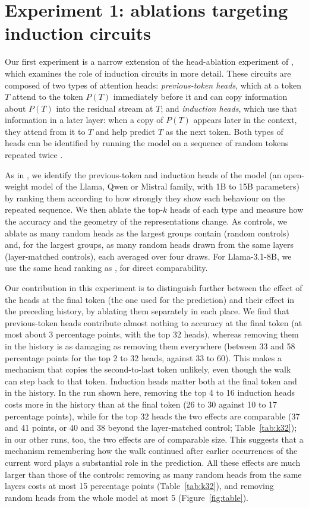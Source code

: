 \documentclass[11pt,a4paper]{article}
\begin{document}
\section{Experiment 1: ablations targeting induction circuits}

Our first experiment is a narrow extension of the head-ablation experiment of \citet{arditi2026}, which examines the
role of induction circuits \citep{olsson2022} in more detail. These circuits are composed of two types of attention
heads: \emph{previous-token heads}, which at a token $T$ attend to the token $P(T)$ immediately before it and can copy
information about $P(T)$ into the residual stream at $T$; and \emph{induction heads}, which use that information in a
later layer: when a copy of $P(T)$ appears later in the context, they attend from it to $T$ and help predict $T$ as the
next token. Both types of heads can be identified by running the model on a sequence of random tokens repeated twice
\citep{olsson2022}.

As in \citet{arditi2026}, we identify the previous-token and induction heads of the model (an open-weight model of the
Llama, Qwen or Mistral family, with 1B to 15B parameters) by ranking them according to how strongly they show each
behaviour on the repeated sequence. We then ablate the top-$k$ heads of each type and measure how the accuracy and the
geometry of the representations change. As controls, we ablate as many random heads as the largest groups contain
(random controls) and, for the largest groups, as many random heads drawn from the same layers (layer-matched
controls), each averaged over four draws. For Llama-3.1-8B, we use the same head ranking as
\citet{arditi2026}, for direct comparability.

Our contribution in this experiment is to distinguish further between the effect of the heads at the final token (the
one used for the prediction) and their effect in the preceding history, by ablating them separately in each place. We
find that previous-token heads contribute almost nothing to accuracy at the final token (at most about 3 percentage
points, with the top 32 heads), whereas removing them in the history is as damaging as removing them everywhere
(between 33 and 58 percentage points for the top 2 to 32 heads, against 33 to 60). This makes a mechanism that copies the second-to-last token unlikely, even though the walk can step back to
that token. Induction heads matter both at the final token and in the history. In the run shown here, removing the top
4 to 16 induction heads costs more in the history than at the final token (26 to 30 against 10 to 17 percentage
points), while for the top 32 heads the two effects are comparable (37 and 41 points, or 40 and 38 beyond the layer-matched control; Table~\ref{tab:k32}); in our other runs, too, the two effects are of comparable size. This
suggests that a mechanism remembering how the walk continued after earlier occurrences of the current word plays a
substantial role in the prediction. All these effects are much larger than those of the controls: removing as many
random heads from the same layers costs at most 15 percentage points (Table~\ref{tab:k32}), and removing random heads
from the whole model at most 5 (Figure~\ref{fig:table}).
\end{document}
